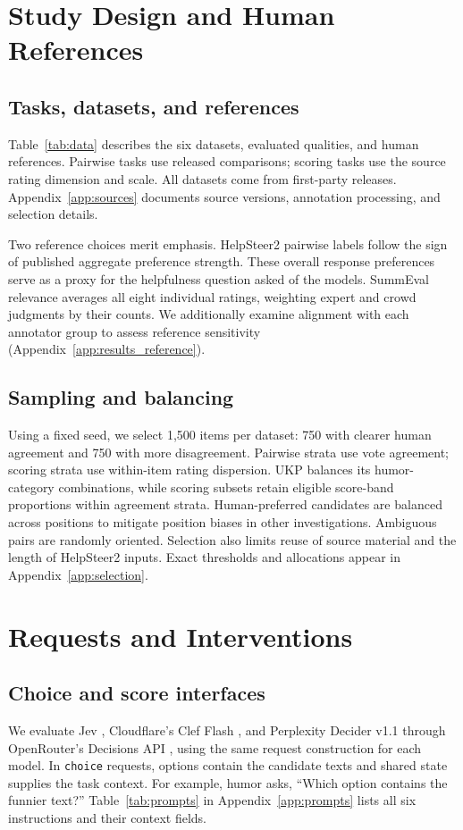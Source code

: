 \documentclass[11pt]{article}
\begin{document}
\section{Study Design and Human References}
\label{sec:data}
\subsection{Tasks, datasets, and references}
Table~\ref{tab:data} describes the six datasets, evaluated qualities, and human references. Pairwise tasks use released comparisons; scoring tasks use the source rating dimension and scale. All datasets come from first-party releases. Appendix~\ref{app:sources} documents source versions, annotation processing, and selection details.

Two reference choices merit emphasis. HelpSteer2 pairwise labels follow the sign of published aggregate preference strength. These overall response preferences serve as a proxy for the helpfulness question asked of the models. SummEval relevance averages all eight individual ratings, weighting expert and crowd judgments by their counts. We additionally examine alignment with each annotator group to assess reference sensitivity (Appendix~\ref{app:results_reference}).

\subsection{Sampling and balancing}
Using a fixed seed, we select 1,500 items per dataset: 750 with clearer human agreement and 750 with more disagreement. Pairwise strata use vote agreement; scoring strata use within-item rating dispersion. UKP balances its humor-category combinations, while scoring subsets retain eligible score-band proportions within agreement strata. Human-preferred candidates are balanced across positions to mitigate position biases in other investigations. Ambiguous pairs are randomly oriented. Selection also limits reuse of source material and the length of HelpSteer2 inputs. Exact thresholds and allocations appear in Appendix~\ref{app:selection}.

\section{Requests and Interventions}
\label{sec:interventions}
\subsection{Choice and score interfaces}
We evaluate Jev \citep{almeida2026jev}, Cloudflare's Clef Flash \citep{chen2026clef}, and Perplexity Decider v1.1 \citep{perplexity2026decider} through OpenRouter's Decisions API \citep{openrouter2026}, using the same request construction for each model. In \texttt{choice} requests, options contain the candidate texts and shared state supplies the task context. For example, humor asks, ``Which option contains the funnier text?'' Table~\ref{tab:prompts} in Appendix~\ref{app:prompts} lists all six instructions and their context fields.
\end{document}
